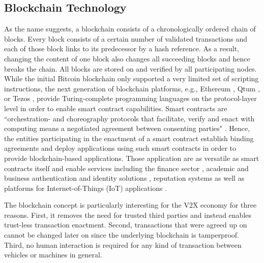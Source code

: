 \documentclass{llncs}
\begin{document}
{		%
		
		\subsection{Blockchain Technology}
			\label{ss:blockchain-intro}
			
			As the name suggests, a blockchain consists of a chronologically ordered chain of blocks. Every block consists of a certain number of validated transactions and each of those block links to its predecessor by a hash reference. As a result, changing the content of one block also changes all succeeding blocks and hence breaks the chain. All blocks are stored on and verified by all participating nodes. While the initial Bitcoin blockchain only supported a very limited set of scripting instructions, the next generation of blockchain platforms, e.g., Ethereum \cite{wood2014ethereum}, Qtum \cite{qtumWhitepaper}, or Tezos \cite{tezosWhitepaper}, provide Turing-complete programming languages on the protocol-layer level in order to enable smart contract capabilities. Smart contracts are ``orchestration- and choreography protocols that facilitate, verify and enact with computing means a negotiated agreement between consenting parties" \cite{qtumWhitepaper}. Hence, the entities participating in the enactment of a smart contract establish binding agreements and deploy applications using such smart contracts in order to provide blockchain-based applications. Those application are as versatile as smart contracts itself and enable services including the finance sector \cite{nguyen2016blockchain}\cite{saltWhitepaper}, academic and business authentication and identity solutions \cite{leidingUnchained}\cite{CivicWhitepaper}\cite{AuthcoinLeiding2016MCIS}\cite{mccorry2015authenticated}, reputation systems \cite{SemadaWhitepaper} as well as platforms for Internet-of-Things (IoT) applications \cite{christidis2016blockchains}\cite{ouaddah2017towards}. 	
			
			The blockchain concept is particularly interesting for the V2X economy for three reasons. First, it removes the need for trusted third parties and instead enables trust-less transaction enactment. Second, transactions that were agreed up on cannot be changed later on since the underlying blockchain is tamperproof. Third, no human interaction is required for any kind of transaction between vehicles or machines in general.


}
\end{document}
